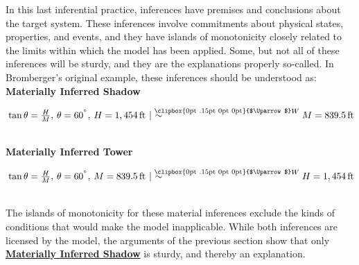 \documentclass{article}                     %
\makeatletter
\newcommand{\Uuparrow}{%
	\raisebox{.2ex}{\clipbox{0pt .15pt 0pt 0pt}{$\Uparrow$}}
}
\newcommand{\nms}{%
	\mathbin{\mathpalette\@nms\expandafter}
}
\newcommand{\@nms}{\mid\joinrel\mkern-.5mu\sim}
\newcommand{\mrc}[1]{\mathbin{
		\mathchoice
		{\normalsize\hspace{.5mm}\nms^{\mkern-19mu\scriptsize\Uuparrow#1}\hspace{-.5mm}}
		{\normalsize\hspace{.5mm}\nms^{\mkern-19mu\scriptsize\Uuparrow#1}\hspace{-.5mm}}
		{\footnotesize\hspace{.5mm}\nms^{\mkern-13.5mu\fontsize{5.5}{0}\Uuparrow#1}}
		{\scriptsize\nms^{\mkern-10mu\tiny\Uuparrow#1}}
	}
}
\newcommand{\degree}{\ensuremath{^\circ}}
\makeatother
\begin{document}
In this last inferential practice, inferences have premises and conclusions about the target system. These inferences involve commitments about physical states, properties, and events, and they have islands of monotonicity closely related to the limits within which the model has been applied.  Some, but not all of these inferences will be sturdy, and they are the explanations properly so-called. In Bromberger's original example, these inferences should be understood as:\\ 


%

\noindent \label{eq:shadow_nm}\textbf{Materially Inferred Shadow}\hspace{8mm}\begin{minipage}[t]{.8\textwidth}
	$\hspace{.5ex} \tan \theta  = \frac{H}{M},\hspace{.5ex} \theta = 60^{\degree},\hspace{.5ex} H = 1,454\,\text{ft} \mrc{W}\, M = 839.5\,\text{ft}$
\end{minipage}\\ 

\noindent \label{eq:height_nm}\textbf{Materially Inferred Tower}\hspace{10.5mm}\begin{minipage}[t]{.8\textwidth}
	$\hspace{.5ex} \tan \theta  = \frac{H}{M},\hspace{.5ex} \theta = 60^{\degree},\hspace{.5ex} M = 839.5\,\text{ft} \mrc{W}\, H = 1,454\,\text{ft}$
\end{minipage}\\ 

\noindent  The islands of monotonicity for these material inferences exclude the kinds of conditions that would make the model inapplicable. While both inferences are licensed by the model, the arguments of the previous section show that only  \hyperref[eq:shadow_nm]{\textbf{Materially Inferred Shadow}} is sturdy, and thereby an explanation.


\end{document}
